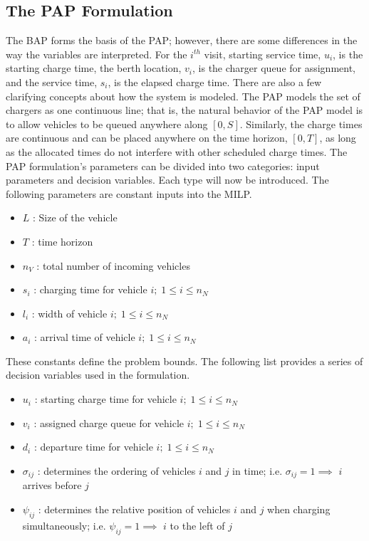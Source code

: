 \documentclass[utf8]{FrontiersinHarvard}
\begin{document}
\subsection{The PAP Formulation}
\label{sec:the-pap-formulation}
The BAP forms the basis of the PAP; however, there are some differences in the way the variables are interpreted. For
the \(i^{th}\) visit, starting service time, \(u_i\), is the starting charge time, the berth location, \(v_i\), is the charger
queue for assignment, and the service time, \(s_i\), is the elapsed charge time. There are also a few clarifying concepts
about how the system is modeled. The PAP models the set of chargers as one continuous line; that is, the natural
behavior of the PAP model is to allow vehicles to be queued anywhere along \([0,S]\). Similarly, the charge times are
continuous and can be placed anywhere on the time horizon, \([0,T]\), as long as the allocated times do not interfere with
other scheduled charge times. The PAP formulation's parameters can be divided into two categories: input parameters and
decision variables. Each type will now be introduced. The following parameters are constant inputs into the MILP.

\begin{itemize}
\item \(L\)   : Size of the vehicle
\item \(T\)   : time horizon
\item \(n_V\) : total number of incoming vehicles
\item \(s_i\) : charging time for vehicle \(i;\; 1 \leq i \leq n_N\)
\item \(l_i\) : width of vehicle \(i;\; 1 \leq i \leq n_N\)
\item \(a_i\) : arrival time of vehicle \(i;\; 1 \leq i \leq n_N\)
\end{itemize}

These constants define the problem bounds. The following list provides a series of decision variables used in the
formulation.

\begin{itemize}
\item \(u_i\)    : starting charge time for vehicle \(i;\; 1 \leq i \leq n_N\)
\item \(v_i\)    : assigned charge queue for vehicle \(i;\; 1 \leq i \leq n_N\)
\item \(d_i\)    : departure time for vehicle \(i;\; 1 \leq i \leq n_N\)
\item \(\sigma_{ij}\) : determines the ordering of vehicles \(i\) and \(j\) in time; i.e. \(\sigma_{ij} = 1 \implies\) \(i\) arrives before \(j\)
\item \(\psi_{ij}\) : determines the relative position of vehicles \(i\) and \(j\) when charging simultaneously; i.e. \(\psi_{ij} = 1
  \implies\) \(i\) to the left of \(j\)
\end{itemize}
\end{document}
